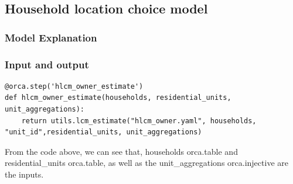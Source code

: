 \documentclass{article}\usepackage[]{graphicx}\usepackage[]{color}
\begin{document}
\subsection{Household location choice model}
\subsubsection{Model Explanation}
\subsubsection{Input and output}
\begin{lstlisting}
@orca.step('hlcm_owner_estimate')
def hlcm_owner_estimate(households, residential_units, unit_aggregations):
    return utils.lcm_estimate("hlcm_owner.yaml", households, "unit_id",residential_units, unit_aggregations)
\end{lstlisting}

From the code above, we can see that, households orca.table and residential\_units orca.table, as well as the unit\_aggregations orca.injective are the inputs.
\end{document}
